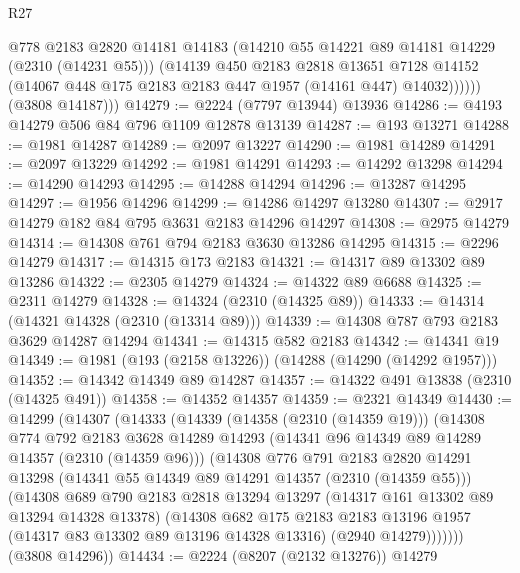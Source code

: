 \begin{lexlean}{R27}
\begin{coremodule}
                @778
                @2183
                @2820
                @14181
                @14183
                (@14210 @55 @14221 @89 @14181 @14229 (@2310 (@14231 @55)))
                (@14139
                  @450
                  @2183
                  @2818
                  @13651
                  @7128
                  @14152
                  (@14067 @448 @175 @2183 @2183 @447 @1957 (@14161 @447) @14032))))))
        (@3808 @14187)))
@14279 := @2224 (@7797 @13944) @13936
@14286 := @4193 @14279 @506 @84 @796 @1109 @12878 @13139
@14287 := @193 @13271
@14288 := @1981 @14287
@14289 := @2097 @13227
@14290 := @1981 @14289
@14291 := @2097 @13229
@14292 := @1981 @14291
@14293 := @14292 @13298
@14294 := @14290 @14293
@14295 := @14288 @14294
@14296 := @13287 @14295
@14297 := @1956 @14296
@14299 := @14286 @14297 @13280
@14307 := @2917 @14279 @182 @84 @795 @3631 @2183 @14296 @14297
@14308 := @2975 @14279
@14314 := @14308 @761 @794 @2183 @3630 @13286 @14295
@14315 := @2296 @14279
@14317 := @14315 @173 @2183
@14321 := @14317 @89 @13302 @89 @13286
@14322 := @2305 @14279
@14324 := @14322 @89 @6688
@14325 := @2311 @14279
@14328 := @14324 (@2310 (@14325 @89))
@14333 := @14314 (@14321 @14328 (@2310 (@13314 @89)))
@14339 := @14308 @787 @793 @2183 @3629 @14287 @14294
@14341 := @14315 @582 @2183
@14342 := @14341 @19
@14349 := @1981 (@193 (@2158 @13226)) (@14288 (@14290 (@14292 @1957)))
@14352 := @14342 @14349 @89 @14287
@14357 := @14322 @491 @13838 (@2310 (@14325 @491))
@14358 := @14352 @14357
@14359 := @2321 @14349
@14430 := @14299
    (@14307
      (@14333
        (@14339
          (@14358 (@2310 (@14359 @19)))
          (@14308
            @774
            @792
            @2183
            @3628
            @14289
            @14293
            (@14341 @96 @14349 @89 @14289 @14357 (@2310 (@14359 @96)))
            (@14308
              @776
              @791
              @2183
              @2820
              @14291
              @13298
              (@14341 @55 @14349 @89 @14291 @14357 (@2310 (@14359 @55)))
              (@14308
                @689
                @790
                @2183
                @2818
                @13294
                @13297
                (@14317 @161 @13302 @89 @13294 @14328 @13378)
                (@14308
                  @682
                  @175
                  @2183
                  @2183
                  @13196
                  @1957
                  (@14317 @83 @13302 @89 @13196 @14328 @13316)
                  (@2940 @14279)))))))
      (@3808 @14296))
@14434 := @2224 (@8207 (@2132 @13276)) @14279

\end{coremodule}
\end{lexlean}
